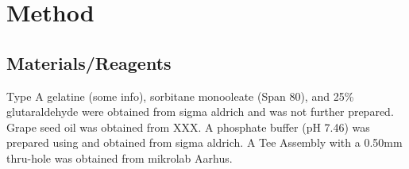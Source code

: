 \chapter{Method}

\section{Materials/Reagents} %

Type A gelatine (some info), sorbitane monooleate (Span 80), and 25\% glutaraldehyde were obtained from sigma aldrich and was not further prepared. 
Grape seed oil was obtained from XXX. %
A phosphate buffer (pH 7.46) was prepared using  and  obtained from sigma aldrich. 
A Tee Assembly with a 0.50mm thru-hole was obtained from mikrolab Aarhus. 